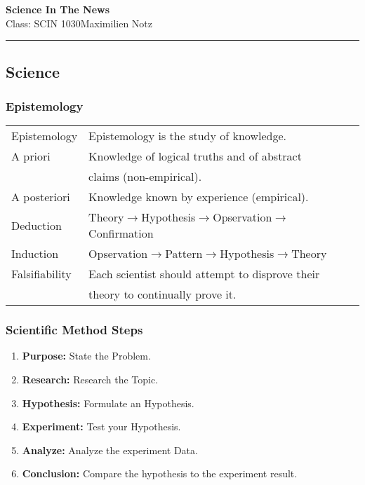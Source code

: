 \documentclass[5pt]{article}
\begin{document}
\begin{center}
     \Large{\textbf{Science In The News}}\\
     \footnotesize{Class: SCIN 1030}\hfill\footnotesize{Maximilien Notz}
     \noindent\rule{20.2cm}{0.4pt}
\end{center}


\begin{multicols}{2}
\setcounter{secnumdepth}{0}

\subsection{Science}
\subsubsection{Epistemology}
    \begin{tabular}{ll}
        Epistemology    & Epistemology is the study of knowledge.\\ 
        A priori        & Knowledge of logical truths and of abstract\\
                        & claims (non-empirical).\\
        A posteriori    & Knowledge known by experience (empirical).\\
        Deduction       & \small{Theory$\rightarrow$Hypothesis$\rightarrow$Opservation$\rightarrow$Confirmation}\\
        Induction       & Opservation$\rightarrow$Pattern$\rightarrow$Hypothesis$\rightarrow$Theory\\
        Falsifiability  & Each scientist should attempt to disprove their\\
                        & theory to continually prove it.\\
    \end{tabular}

\subsubsection{Scientific Method Steps}
    \begin{enumerate}
        \item \textbf{Purpose:} State the Problem.
        \item \textbf{Research:} Research the Topic.
        \item \textbf{Hypothesis:} Formulate an Hypothesis.
        \item \textbf{Experiment:} Test your Hypothesis.
        \item \textbf{Analyze:} Analyze the experiment Data.
        \item \textbf{Conclusion:} Compare the hypothesis to the experiment result.
    \end{enumerate}


\end{multicols}
\end{document}

